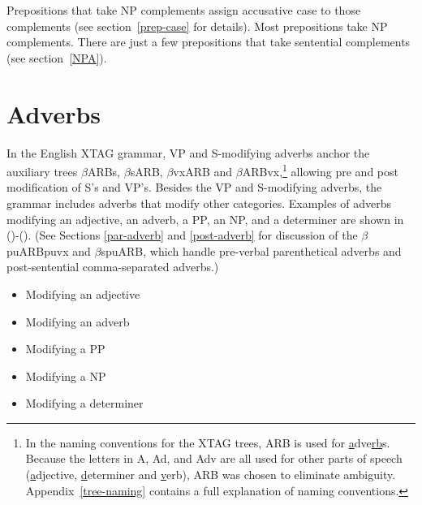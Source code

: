 
Prepositions that take NP complements assign accusative case to those
complements (see section~\ref{prep-case} for details).  Most prepositions take
NP complements.  There are just a few prepositions that take sentential
complements (see section~\ref{NPA}).


\section{Adverbs}
\label{adv-modifier}

In the English XTAG grammar, VP and S-modifying adverbs anchor the
auxiliary trees $\beta$ARBs, $\beta$sARB, $\beta$vxARB and
$\beta$ARBvx,\footnote{In the naming conventions for the XTAG trees,
ARB is used for {\underline a}dve{\underline {rb}}s.  Because the
letters in A, Ad, and Adv are all used for other parts of speech
({\underline a}djective, {\underline d}eterminer and {\underline
v}erb), ARB was chosen to eliminate ambiguity.
Appendix~\ref{tree-naming} contains a full explanation of naming
conventions.}  allowing pre and post modification of S's and VP's.
Besides the VP and S-modifying adverbs, the grammar includes adverbs
that modify other categories. Examples of adverbs modifying an
adjective, an adverb, a PP, an NP, and a determiner are shown in
()-(). (See Sections \ref{par-adverb} and
\ref{post-adverb} for discussion of the $\beta$puARBpuvx and
$\beta$spuARB, which handle pre-verbal parenthetical adverbs and
post-sentential comma-separated adverbs.)

\begin{itemize}
\item{Modifying an adjective}

\item{Modifying an adverb}

\item{Modifying a PP}

\item{Modifying a NP}

\item{Modifying a determiner}

\end{itemize}

